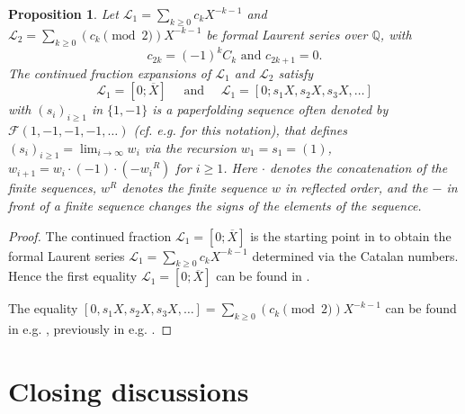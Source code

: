 \documentclass{article}
\newcommand{\QQ}{\mathbb Q}
\newtheorem{proposition}{Proposition}
\begin{document}
\begin{proposition}
Let $\mathcal{L}_1=\sum_{k\geq 0}c_kX^{-k-1}$ and $\mathcal{L}_2=\sum_{k\geq 0}(c_k\pmod 2)X^{-k-1}$ be formal Laurent series over $\QQ$, with $$c_{2k}=(-1)^kC_k \mbox{ and } c_{2k+1}=0.$$
The continued fraction expansions of $\mathcal{L}_1$ and $\mathcal{L}_2$ satisfy $$\mathcal{L}_1=[0;\overline{X}]\quad \mbox{ and } \quad \mathcal{L}_1=[0;{s_1 X},s_2X,s_3X,\ldots]$$
with $(s_i)_{i\geq 1}$ in $\{1,-1\}$ is a paperfolding sequence often denoted by $\mathcal{F}(1,-1,-1,-1,\ldots)$ (cf. e.g. \cite{Alletal} for this notation), that defines $(s_i)_{i\geq 1}=\lim_{i\to\infty}w_i$ via the recursion $w_1=s_1=(1)$, $w_{i+1}=w_i\cdot(-1)\cdot(-{w_i}^R)$ for $i\geq 1$. Here $\cdot$ denotes the concatenation of the finite sequences, $w^R$ denotes the finite sequence $w$ in reflected order, and the $-$ in front of a finite sequence changes the signs of the elements of the sequence. 
\end{proposition}
\begin{proof}
The continued fraction $\mathcal{L}_1=[0;\overline{X}]$ is the starting point in \cite{hofJNT} to obtain the formal Laurent series $\mathcal{L}_1=\sum_{k\geq 0}c_kX^{-k-1}$ determined via the Catalan numbers. Hence the first equality $\mathcal{L}_1=[0;\overline{X}]$ can be found in \cite{hofJNT}. 

The equality $[0,{s_1 X},s_2X,s_3X,\ldots]=\sum_{k\geq 0}(c_k\pmod 2)X^{-k-1}$ can be found in e.g. \cite[Equation~(9)]{Alletal}, previously in e.g. \cite[Theorem~1]{PoSh}. 
\end{proof}



\section{Closing discussions}\label{sec:4}
\end{document}
